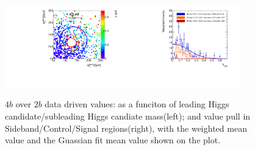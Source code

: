 \begin{figure}[htbp!]
\begin{center}
\includegraphics[width=0.45\textwidth,angle=-90]{figures/boosted/AppendixMuqcdstudy/FourTag_Incl_mH0H1.pdf}
\includegraphics[width=0.45\textwidth,angle=-90]{figures/boosted/AppendixMuqcdstudy/FourTag_Incl_mH0H1_pull.pdf}
\caption{$4b$ over $2b$ data driven \muqcd values: \muqcd as a funciton of leading Higgs candidate/subleading Higgs candiate mass(left); and \muqcd value pull in Sideband/Control/Signal regions(right), with the weighted mean value and the Guassian fit mean value shown on the plot.}
\label{fig:app-muqcd-4b}
\end{center}
\end{figure}



